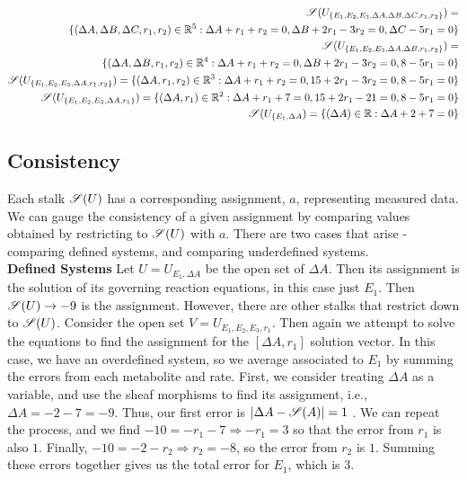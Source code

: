 \documentclass{article}
\begin{document}
\begin{align*}
	\mathscr{S}(U_{\{E_1, E_2, E_3, \Delta A, \Delta B, \Delta C, r_1, r_2\}})= \\
	\{(\Delta A, \Delta B, \Delta C, r_1, r_2) \in 
	\mathbb{R}^5:\Delta A 
	+r_1+r_2=0, \Delta B+2r_1-3r_2=0, \Delta C -5r_1=0\}\\
	\mathscr{S}(U_{\{E_1, E_2, E_3, \Delta A, \Delta B, r_1, r_2\}}) = \\ \{(\Delta A, 
	\Delta B, r_1, r_2) \in 
	\mathbb{R}^4:\Delta A 
	+r_1+r_2=0, \Delta B+2r_1-3r_2=0, 8 -5r_1=0\}\\
	\mathscr{S}(U_{\{E_1, E_2, E_3, \Delta A, r_1, r_2\}}) = 
	\{(\Delta A, r_1, r_2) \in \mathbb{R}^3:\Delta A 
	+r_1+r_2=0, 15+2r_1-3r_2=0, 8-5r_1=0\}\\
	\mathscr{S}(U_{\{E_1, E_2, E_3, \Delta A, r_1\}}) = \{(\Delta A, r_1) \in 
	\mathbb{R}^2:\Delta A 
	+r_1+7=0, 15+2r_1-21=0, 8-5r_1=0\}\\
	\mathscr{S}(U_{\{E_1, \Delta A}) = \{(\Delta A) \in 
	\mathbb{R}:\Delta A 
	+2+7=0\}
\end{align*}

\subsection{Consistency}

Each stalk $\mathscr{S}(U)$ has a corresponding assignment, $a$, representing measured 
data. We can gauge the consistency of a given assignment by comparing values 
obtained by restricting to $\mathscr{S}(U)$ with $a$. There are two cases that arise - 
comparing defined systems, and comparing underdefined systems.\\
\textbf{Defined Systems}
Let $U = U_{E_1,\Delta A}$ be the open set of $\Delta A$. Then its assignment 
is the solution of its governing reaction equations, in this case just $E_1$. 
Then $\mathscr{S}(U) \to -9$ is the assignment. However, there are other stalks that 
restrict down to $\mathscr{S}(U)$. Consider the open set $V = U_{E_1,E_2,E_3, r_1}$. 
Then again we attempt to solve the equations to find the assignment for the 
$[\Delta A, r_1]$ solution vector. In this case,  we have an overdefined 
system, so we average
associated to $E_1$ by summing the errors from each metabolite and rate. First,
we consider treating $\Delta A $ as a variable, and use the sheaf morphisms to
find its assignment, i.e., $\Delta A = -2 - 7 = -9$. Thus, our first error is
$|\Delta A - \mathscr{S}(A)| = 1$ . We can repeat
the process, and we find $-10 = -r_1 - 7 \Rightarrow -r_1 = 3$ so that the error
from $r_1$ is also $1$. Finally, $-10  = -2 - r_2 \Rightarrow r_2 =  -8$, so the
error from $r_2$ is $1$. Summing these errors together gives us the total error
for $E_1$, which is $3$.
\end{document}
